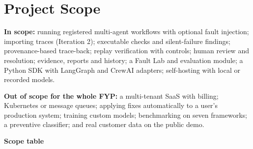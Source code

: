 \section{Project Scope}

\textbf{In scope:} running registered multi-agent workflows with optional fault injection; importing traces (Iteration 2); executable checks and silent-failure findings; provenance-based trace-back; replay verification with controls; human review and resolution; evidence, reports and history; a Fault Lab and evaluation module; a Python SDK with LangGraph and CrewAI adapters; self-hosting with local or recorded models.

\textbf{Out of scope for the whole FYP:} a multi-tenant SaaS with billing; Kubernetes or message queues; applying fixes automatically to a user's production system; training custom models; benchmarking on seven frameworks; a preventive classifier; and real customer data on the public demo.

\textbf{Scope table}

